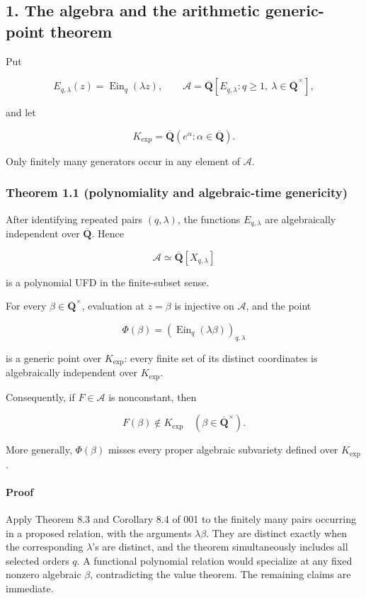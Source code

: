 \documentclass[11pt]{article}
\theoremstyle{keio}
\theoremstyle{definition}
\theoremstyle{remark}
\begin{document}
\subsection{1. The algebra and the arithmetic generic-point theorem}

Put

\[
  E_{q,\lambda}(z)=\operatorname{Ein}_q(\lambda z),\qquad
  \mathscr A=\overline{\mathbf Q}
  [E_{q,\lambda}:q\ge 1,\ \lambda\in\overline{\mathbf Q}^{\times}],
\]

and let

\[
  K_{\exp}=\overline{\mathbf Q}
  (e^\alpha:\alpha\in\overline{\mathbf Q}).
\]

Only finitely many generators occur in any element of \(\mathscr A\).

\subsubsection{Theorem 1.1 (polynomiality and algebraic-time genericity)}

After identifying repeated pairs \((q,\lambda)\), the functions
\(E_{q,\lambda}\) are algebraically independent over
\(\overline{\mathbf Q}\). Hence

\[
  \mathscr A\simeq
  \overline{\mathbf Q}[X_{q,\lambda}]
\]

is a polynomial UFD in the finite-subset sense.

For every \(\beta\in\overline{\mathbf Q}^{\times}\), evaluation at \(z=\beta\)
is injective on \(\mathscr A\), and the point

\[
  \Phi(\beta)=
  (\operatorname{Ein}_q(\lambda\beta))_{q,\lambda}
\]

is a generic point over \(K_{\exp}\): every finite set of its distinct
coordinates is algebraically independent over \(K_{\exp}\).

Consequently, if \(F\in\mathscr A\) is nonconstant, then

\[
  F(\beta)\notin K_{\exp}
  \quad(\beta\in\overline{\mathbf Q}^{\times}).                 \tag{J-1.1}
\]

More generally, \(\Phi(\beta)\) misses every proper algebraic subvariety
defined over \(K_{\exp}\).

\paragraph{Proof}

Apply Theorem 8.3 and Corollary 8.4 of 001 to the finitely many pairs
occurring in a proposed relation, with the arguments \(\lambda\beta\).
They are distinct exactly when the corresponding \(\lambda\)'s are distinct,
and the theorem simultaneously includes all selected orders \(q\). A
functional polynomial relation would specialize at any fixed nonzero
algebraic \(\beta\), contradicting the value theorem. The remaining claims
are immediate.
\end{document}
